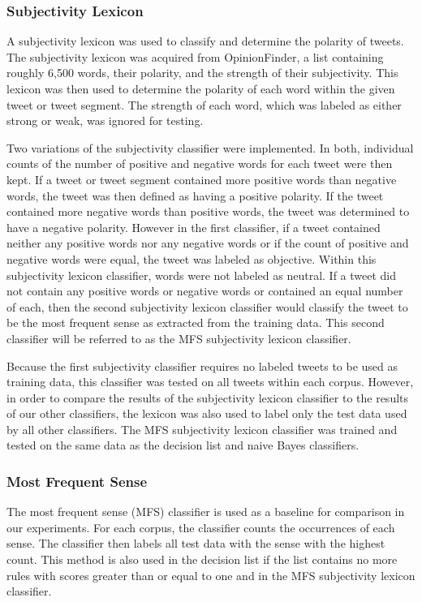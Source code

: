 \documentclass[11pt]{article}
\begin{document}
\subsubsection*{Subjectivity Lexicon}
A subjectivity lexicon was used to classify and determine the polarity of tweets. The subjectivity lexicon was acquired from OpinionFinder, a list containing roughly 6,500 words, their polarity, and the strength of their subjectivity. This lexicon was then used to determine the polarity of each word within the given tweet or tweet segment. The strength of each word, which was labeled as either strong or weak, was ignored for testing.

\indent Two variations of the subjectivity classifier were implemented. In both, individual counts of the number of positive and negative words for each tweet were then kept. If a tweet or tweet segment contained more positive words than negative words, the tweet was then defined as having a positive polarity. If the tweet contained more negative words than positive words, the tweet was determined to have a negative polarity. However in the first classifier, if a tweet contained neither any positive words nor any negative words or if the count of positive and negative words were equal, the tweet was labeled as objective. Within this subjectivity lexicon classifier, words were not labeled as neutral. If a tweet did not contain any positive words or negative words or contained an equal number of each, then the second subjectivity lexicon classifier would classify the tweet to be the most frequent sense as extracted from the training data. This second classifier will be referred to as the MFS subjectivity lexicon classifier.

\indent Because the first subjectivity classifier requires no labeled tweets to be used as training data, this classifier was tested on all tweets within each corpus. However, in order to compare the results of the subjectivity lexicon classifier to the results of our other classifiers, the lexicon was also used to label only the test data used by all other classifiers. The MFS subjectivity lexicon classifier was trained and tested on the same data as the decision list and naive Bayes classifiers. 

\subsubsection*{Most Frequent Sense}
The most frequent sense (MFS) classifier is used as a baseline for comparison in our experiments. For each corpus, the classifier counts the occurrences of each sense. The classifier then labels all test data with the sense with the highest count. This method is also used in the decision list if the list contains no more rules with scores greater than or equal to one and in the MFS subjectivity lexicon classifier.
\end{document}
